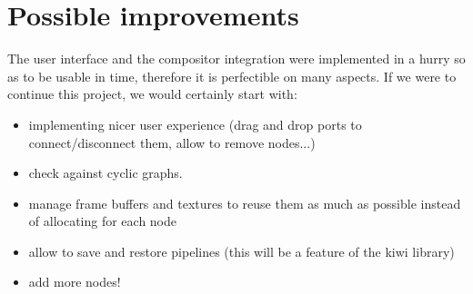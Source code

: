 \section{Possible improvements}

The user interface and the compositor integration were implemented in a hurry so
as to be usable in time, therefore it is perfectible on many aspects.
If we were to continue this project, we would certainly start with:
\begin{itemize}
    \item implementing nicer user experience (drag and drop ports to connect/disconnect them, allow to remove nodes...)
    \item check against cyclic graphs.
    \item manage frame buffers and textures to reuse them as much as possible instead of allocating for each node
    \item allow to save and restore pipelines (this will be a feature of the kiwi library)
    \item add more nodes!
\end{itemize}
